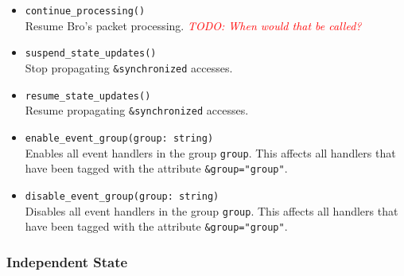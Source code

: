 \documentclass[10pt,landscape]{article}
\def\todo#1{\textit{\textcolor{red}{TODO: #1}}}
\begin{document}
\begin{multicols*}{2}
\begin{itemize}
    Stop Bro's packet processing. \todo{When would that be called?}
  \item \verb|continue_processing()|\\
    Resume Bro's packet processing. \todo{When would that be called?}
  \item \verb|suspend_state_updates()|\\
    Stop propagating \verb|&synchronized| accesses.
  \item \verb|resume_state_updates()|\\
    Resume propagating \verb|&synchronized| accesses.
  \item \verb|enable_event_group(group: string)|\\
    Enables all event handlers in the group \verb|group|. This affects all
    handlers that have been tagged with the attribute \verb|&group="group"|.
  \item \verb|disable_event_group(group: string)|\\
    Disables all event handlers in the group \verb|group|. This affects all
    handlers that have been tagged with the attribute \verb|&group="group"|.
\end{itemize}

\subsubsection*{Independent State}


\end{multicols*}
\end{document}

